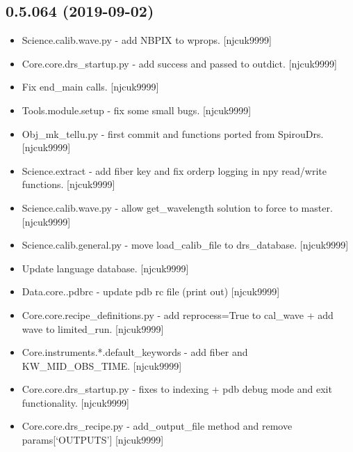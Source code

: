 \documentclass[a4paper,10pt,english]{report}
\begin{document}
\subsection{0.5.064 (2019-09-02)}
\label{\detokenize{misc/changelog:id77}}\begin{itemize}
\item {} 
Science.calib.wave.py - add NBPIX to wprops. {[}njcuk9999{]}

\item {} 
Core.core.drs\_startup.py - add success and passed to outdict.
{[}njcuk9999{]}

\item {} 
Fix end\_main calls. {[}njcuk9999{]}

\item {} 
Tools.module.setup - fix some small bugs. {[}njcuk9999{]}

\item {} 
Obj\_mk\_tellu.py - first commit and functions ported from SpirouDrs.
{[}njcuk9999{]}

\item {} 
Science.extract - add fiber key and fix orderp logging in npy
read/write functions. {[}njcuk9999{]}

\item {} 
Science.calib.wave.py - allow get\_wavelength solution to force to
master. {[}njcuk9999{]}

\item {} 
Science.calib.general.py - move load\_calib\_file to drs\_database.
{[}njcuk9999{]}

\item {} 
Update language database. {[}njcuk9999{]}

\item {} 
Data.core..pdbrc - update pdb rc file (print out) {[}njcuk9999{]}

\item {} 
Core.core.recipe\_definitions.py - add reprocess=True to cal\_wave + add
wave to limited\_run. {[}njcuk9999{]}

\item {} 
Core.instruments.*.default\_keywords - add fiber and KW\_MID\_OBS\_TIME.
{[}njcuk9999{]}

\item {} 
Core.core.drs\_startup.py - fixes to indexing + pdb debug mode and exit
functionality. {[}njcuk9999{]}

\item {} 
Core.core.drs\_recipe.py - add\_output\_file method and remove
params{[}‘OUTPUTS’{]} {[}njcuk9999{]}


\end{itemize}
\end{document}
